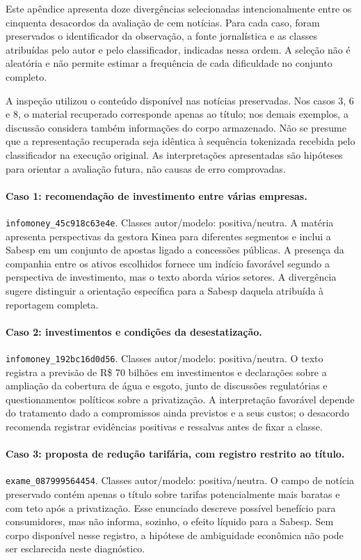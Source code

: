 Este apêndice apresenta doze divergências selecionadas intencionalmente entre os cinquenta desacordos da avaliação de cem notícias. Para cada caso, foram preservados o identificador da observação, a fonte jornalística e as classes atribuídas pelo autor e pelo classificador, indicadas nessa ordem. A seleção não é aleatória e não permite estimar a frequência de cada dificuldade no conjunto completo.

A inspeção utilizou o conteúdo disponível nas notícias preservadas. Nos casos 3, 6 e 8, o material recuperado corresponde apenas ao título; nos demais exemplos, a discussão considera também informações do corpo armazenado. Não se presume que a representação recuperada seja idêntica à sequência tokenizada recebida pelo classificador na execução original. As interpretações apresentadas são hipóteses para orientar a avaliação futura, não causas de erro comprovadas.

\paragraph{Caso 1: recomendação de investimento entre várias empresas.}
\texttt{infomoney\_\allowbreak{}45c918c63e4e}. Classes autor/modelo: positiva/neutra. A matéria apresenta perspectivas da gestora Kinea para diferentes segmentos e inclui a Sabesp em um conjunto de apostas ligado a concessões públicas. A presença da companhia entre os ativos escolhidos fornece um indício favorável segundo a perspectiva de investimento, mas o texto aborda vários setores. A divergência sugere distinguir a orientação específica para a Sabesp daquela atribuída à reportagem completa.

\paragraph{Caso 2: investimentos e condições da desestatização.}
\texttt{infomoney\_\allowbreak{}192bc16d0d56}. Classes autor/modelo: positiva/neutra. O texto registra a previsão de R\$ 70 bilhões em investimentos e declarações sobre a ampliação da cobertura de água e esgoto, junto de discussões regulatórias e questionamentos políticos sobre a privatização. A interpretação favorável depende do tratamento dado a compromissos ainda previstos e a seus custos; o desacordo recomenda registrar evidências positivas e ressalvas antes de fixar a classe.

\paragraph{Caso 3: proposta de redução tarifária, com registro restrito ao título.}
\texttt{exame\_\allowbreak{}087999564454}. Classes autor/modelo: positiva/neutra. O campo de notícia preservado contém apenas o título sobre tarifas potencialmente mais baratas e com teto após a privatização. Esse enunciado descreve possível benefício para consumidores, mas não informa, sozinho, o efeito líquido para a Sabesp. Sem corpo disponível nesse registro, a hipótese de ambiguidade econômica não pode ser esclarecida neste diagnóstico.

